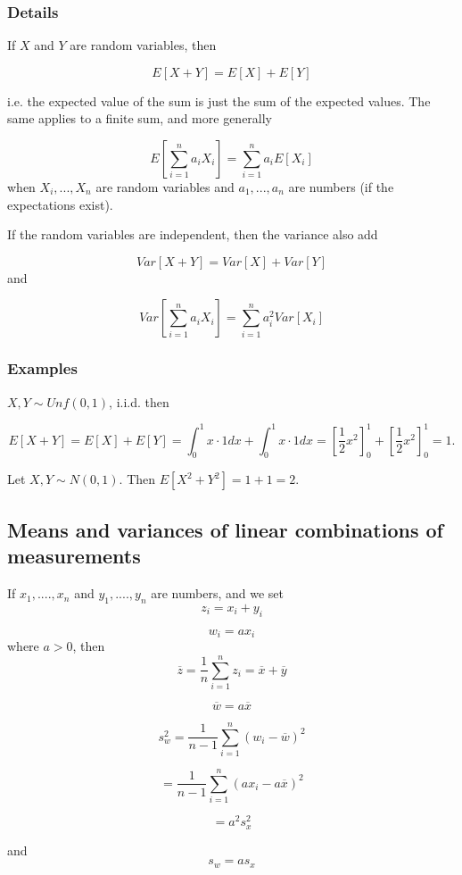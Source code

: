 \documentclass[12pt,a4paper]{article}
\theoremstyle{regla}
\theoremstyle{remark}
\theoremstyle{definition}
\theoremstyle{nonumberbreak}
\begin{document}
\subsubsection{Details}
If $X$ and $Y$ are random variables, then

$$
E[X+Y] = E[X]+E[Y]
$$

i.e. the expected value of the sum is just the sum of the expected values. The same applies to a finite sum, and more generally

$$
E[\sum_{i=1}^{n} a_i X_i] = \sum_{i=1}^{n} a_i E[X_i] 
$$
when $X_i,...,X_n$ are random variables and $a_1,...,a_n$ are numbers (if the expectations exist).

If the random variables are independent, then the variance also add

$$
Var[X+Y] = Var[X] + Var[Y]
$$
and

$$
Var\left[\sum_{i=1}^{n} a_i X_i\right] = \sum_{i=1}^{n} a_i^2 Var[X_i]
$$
\subsubsection{Examples}
\begin{xmpl}
$X,Y \sim Unf(0,1)$, i.i.d. then

$$
E[X+Y]=E[X] + E[Y] = \int_0^1 x\cdot 1dx+\int_0^1 x\cdot 1dx = [\frac{1}{2}x^2]_0^1+[\frac{1}{2}x^2]_0^1=1.
$$
\end{xmpl}
\begin{xmpl}


Let $X,Y\sim N(0,1)$. Then $E[X^2+Y^2] = 1+1=2$.
\end{xmpl}

\subsection{Means and variances of linear combinations of measurements}
\begin{fbox}
\begin{minipage}{0.97\textwidth}
If $x_1,....,x_n$ and $y_1,....,y_n$ are numbers, and we set $$ z_i=x_i + y_i $$

$$w_i=ax_i$$ where $a>0$, then
$$\overline{z} = \frac{1}{n} \sum_{i=1}^{n} z_i= \overline{x} + \overline{y}$$

$$\overline{w}= a\overline{x}$$

$$s_w^2=\frac{1}{n-1}\sum_{i=1}^{n}(w_i-\overline{w})^2$$

$$ = \frac{1}{n-1}\sum_{i=1}^{n}(ax_i-a\overline{x})^2$$

$$ = a^2s_x^2 $$

and $$s_w=as_x$$

\end{minipage}
\end{fbox}
\end{document}
